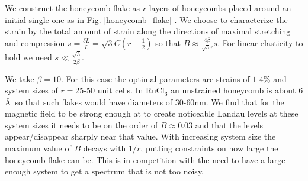 \documentclass[reprint,amsmath,amssymb,aps,prl,groupedaddress,nofootinbib,superscriptaddress]{revtex4-1}
\newcommand{\1}{\mathds{1}}
\begin{document}
We construct the honeycomb flake as $r$ layers of honeycombs placed around an initial single one as in Fig. \ref{honeycomb_flake} \cite{Rachel15}. We choose to characterize the strain by the total amount of strain along the directions of maximal stretching and compression $s = \frac{\delta L}{L} = \sqrt{3}C(r+\frac{1}{2})$ so that $B \approx \frac{4\beta}{\sqrt{3}r}s$. For linear elasticity to hold we need $s \ll \frac{\sqrt{3}}{2\beta}$. 

We take $\beta = 10$. For this case the optimal parameters are strains of $1$-$4$\% and system sizes of $r = 25$-$50$ unit cells. In RuCl$_3$ an unstrained honeycomb is about $6$\AA \ so that such flakes would have diameters of $30$-$60$nm. 
We find that for the magnetic field to be strong enough at to create noticeable Landau levels at these system sizes it needs to be on the order of $B\approx 0.03$ and that the levels appear/disappear sharply near that value. With increasing system size the maximum value of $B$ decays with $1/r$, putting constraints on how large the honeycomb flake can be. This is in competition with the need to have a large enough system to get a spectrum that is not too noisy. 


% 
%
%
%
\end{document}

